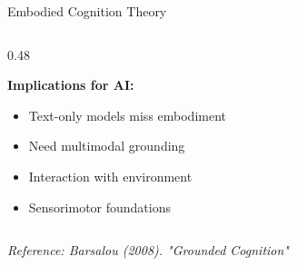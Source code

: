 \documentclass[aspectratio=169]{beamer}
\begin{document}
\begin{frame}[shrink=10]{Embodied Cognition Theory 🏃}
\begin{columns}[T]
\begin{column}{0.48\textwidth}
\begin{center}
\end{center}

\vspace{0.5em}
\textbf{Implications for AI:}
\begin{itemize}\setlength{\itemsep}{0pt}
    \item Text-only models miss embodiment
    \item Need multimodal grounding
    \item Interaction with environment
    \item Sensorimotor foundations
\end{itemize}
\end{column}
\end{columns}

\vspace{0.5em}
\small
\textit{Reference: Barsalou (2008). "Grounded Cognition"}
\end{frame}
\end{document}
